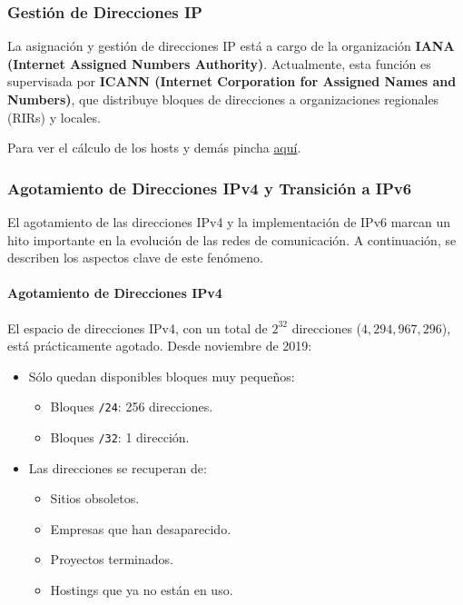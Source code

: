 \documentclass[a4paper,12pt]{article}
\begin{document}
\subsubsection*{Gestión de Direcciones IP}
La asignación y gestión de direcciones IP está a cargo de la organización \textbf{IANA (Internet Assigned Numbers Authority)}. Actualmente, esta función es supervisada por \textbf{ICANN (Internet Corporation for Assigned Names and Numbers)}, que distribuye bloques de direcciones a organizaciones regionales (RIRs) y locales.


Para  ver el cálculo de los hosts y demás pincha \href{https://github.com/ElblogdeIsmael/ElblogdeIsmael.github.io/blob/main/Asignaturas/Tercer%20A%C3%B1o/FR/Resumenes/ETSIIT/CalculoHosts.md}{aquí}.

\subsubsection{Agotamiento de Direcciones IPv4 y Transición a IPv6}

El agotamiento de las direcciones IPv4 y la implementación de IPv6 marcan un hito importante en la evolución de las redes de comunicación. A continuación, se describen los aspectos clave de este fenómeno.

\paragraph{Agotamiento de Direcciones IPv4}

El espacio de direcciones IPv4, con un total de \(2^{32}\) direcciones (\(4,294,967,296\)), está prácticamente agotado. Desde noviembre de 2019:
\begin{itemize}
    \item Sólo quedan disponibles bloques muy pequeños:
    \begin{itemize}
        \item Bloques \texttt{/24}: 256 direcciones.
        \item Bloques \texttt{/32}: 1 dirección.
    \end{itemize}
    \item Las direcciones se recuperan de:
    \begin{itemize}
        \item Sitios obsoletos.
        \item Empresas que han desaparecido.
        \item Proyectos terminados.
        \item Hostings que ya no están en uso.
    \end{itemize}
\end{itemize}
\end{document}
